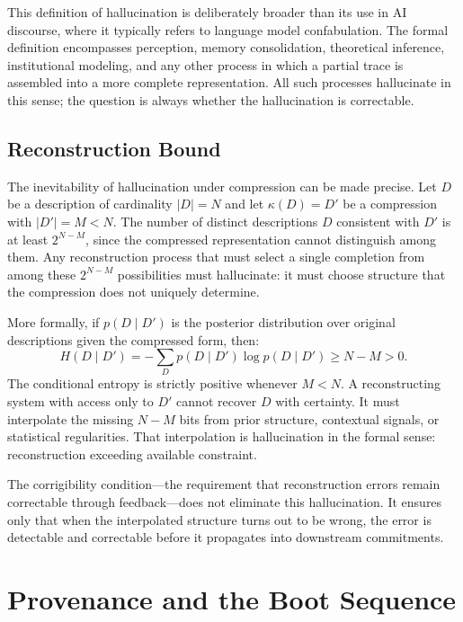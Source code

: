 \begin{remark}
This definition of hallucination is deliberately broader than its use in AI
discourse, where it typically refers to language model confabulation. The formal
definition encompasses perception, memory consolidation, theoretical inference,
institutional modeling, and any other process in which a partial trace is assembled
into a more complete representation. All such processes hallucinate in this sense;
the question is always whether the hallucination is correctable.
\end{remark}

\subsection*{Reconstruction Bound}

The inevitability of hallucination under compression can be made precise. Let $D$
be a description of cardinality $|D| = N$ and let $\kappa(D) = D'$ be a compression
with $|D'| = M < N$. The number of distinct descriptions $D$ consistent with $D'$
is at least $2^{N-M}$, since the compressed representation cannot distinguish among
them. Any reconstruction process that must select a single completion from among
these $2^{N-M}$ possibilities must hallucinate: it must choose structure that the
compression does not uniquely determine.

More formally, if $p(D \mid D')$ is the posterior distribution over original
descriptions given the compressed form, then:
\[
  H(D \mid D') = -\sum_D p(D \mid D') \log p(D \mid D') \geq N - M > 0.
\]
The conditional entropy is strictly positive whenever $M < N$. A reconstructing
system with access only to $D'$ cannot recover $D$ with certainty. It must
interpolate the missing $N - M$ bits from prior structure, contextual signals,
or statistical regularities. That interpolation is hallucination in the formal
sense: reconstruction exceeding available constraint.

The corrigibility condition---the requirement that reconstruction errors remain
correctable through feedback---does not eliminate this hallucination. It ensures
only that when the interpolated structure turns out to be wrong, the error is
detectable and correctable before it propagates into downstream commitments.

\section{Provenance and the Boot Sequence}

